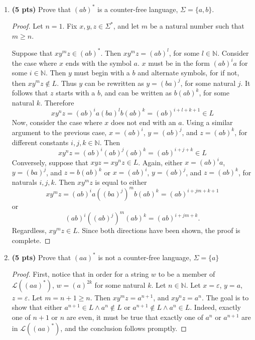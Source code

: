 \documentclass[11pt]{article}
\begin{document}
\begin{enumerate}[label=\textbf{Q\arabic*.}]
\begin{enumerate}[label=\textit{\alph*)}]
\begin{proof}
		Finally, \(w\) must end in a \(b\) because \(w \in \overline{\Sigma ^*\{a\}}\).

		This means that \(w = ab...ab\). It is obvious that \(w = (ab)^n\) for some \(n \in \mathbb{N}^+\). Thus \(w \in (ab)*\), proving that \((ab)^*\) can be matched by a star-free expression.
		\smallbreak
	\end{proof}

	\item \textbf{(5 pts)} Prove that $(ab)^*$ is a counter-free language,  $\Sigma = \{a,b\}$.
	
	\begin{proof}
		Let \(n = 1\). Fix \(x,y,z \in \Sigma ^*\), and let \(m\) be a natural number such that \(m \geq n\).

		Suppose that \(xy^m z \in (ab)^*\). Then \(xy^m z = (ab)^l\), for some \(l \in \mathbb{N}\). Consider the case where \(x\) ends with the symbol \(a\). \(x\) must be in the form \((ab)^i a\) for some \(i \in \mathbb{N}\). Then \(y\) must begin with a \(b\) and alternate symbols, for if not, then \(xy^m z \notin L\). Thus \(y\) can be rewritten as \(y = (ba)^j\), for some natural \(j\). It follows that \(z\) starts with a \(b\), and can be written as \(b(ab)^k\), for some natural \(k\). Therefore
		\[
			xy^n z = (ab)^i a (ba)^l b (ab)^k = (ab)^{i+l+k+1} \in L
		\]
		Now, consider the case where \(x\) does not end with an \(a\). Using a similar argument to the previous case, \(x = (ab)^i\), \(y = (ab)^j\), and \(z = (ab)^k\), for different constants \(i,j,k \in \mathbb{N}\). Then
		\[
			xy^n z = (ab)^i (ab)^j (ab)^k = (ab)^{i+j+k} \in L
		\]
		Conversely, suppose that \(xyz = xy^n z \in L\). Again, either \(x = (ab)^i a\), \(y = (ba)^j\), and \(z = b(ab)^k\) or \(x = (ab)^i\), \(y = (ab)^j\), and \(z = (ab)^k\), for naturals \(i,j,k\). Then \(xy^m z\) is equal to either
		\[
			xy^m z = (ab)^i a ((ba)^j)^m b(ab)^k = (ab)^{i+jm+k+1}
		\]
		or
		\[
			(ab)^i ((ab)^j)^m (ab)^k = (ab)^{i+jm+k} \text{.} 
		\]
		Regardless, \(xy^m z \in L\). Since both directions have been shown, the proof is complete.
		
	\end{proof}
	\item \textbf{(5 pts)} Prove that  $(aa)^*$ is not a counter-free language, $\Sigma = \{a\}$
	
	\begin{proof}
		First, notice that in order for a string \(w\) to be a member of \(\mathcal{L} ((aa)^*)\), \(w = (a)^{2k}\) for some natural \(k\). Let \(n \in \mathbb{N}\). Let \(x = \varepsilon\), \(y = a\), \(z = \varepsilon\). Let \(m = n + 1 \geq n\). Then \(xy^m z = a^{n+1} \), and \(xy^n z = a^n\). The goal is to show that either \(a^{n+1} \in L \land a^n \notin L\) or \(a^{n+1} \notin L \land a^n \in L\). Indeed, exactly one of \(n+1\) or \(n\) are even, it must be true that exactly one of \(a^n\) or \(a^{n+1}\) are in \(\mathcal{L} ((aa)^*)\), and the conclusion follows promptly.


\end{proof}
\end{enumerate}
\end{enumerate}
\end{document}
